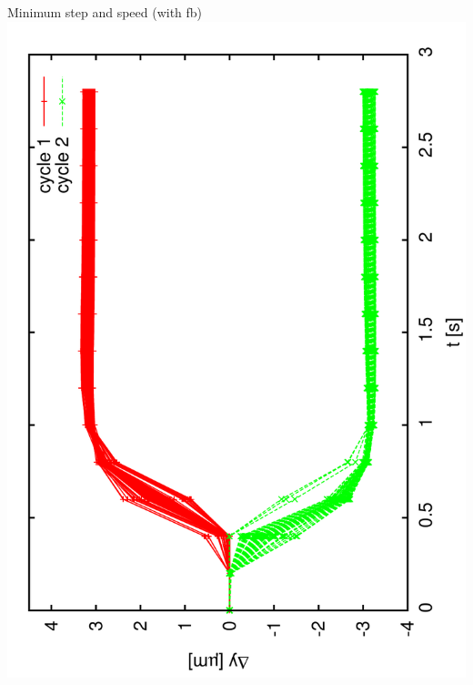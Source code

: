 \documentclass[a4paper,11pt]{book}
\begin{document}
Minimum step and speed (with fb)
\includegraphics[angle=-90,scale=0.22]{image24.pdf}
\end{document}
